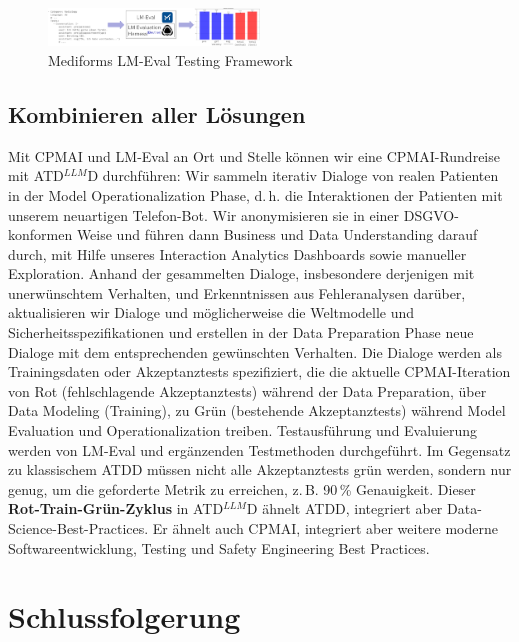 \documentclass[twocolumn]{article}
\newcommand{\ATDLLMD}{ATD$^{LLM}$D}%
\begin{document}
\begin{figure}[hbt!]
  \begin{center}
\includegraphics[width=0.5\textwidth]{figures/LMEval2}
  \vspace{-8mm}
\caption{Mediforms LM-Eval Testing Framework}
\label{fig:lmeval}
\end{center}
\end{figure}

\subsection{Kombinieren aller Lösungen}

Mit CPMAI und LM-Eval an Ort und Stelle können wir eine CPMAI-Rundreise mit \ATDLLMD{} durchführen: Wir sammeln iterativ Dialoge von realen Patienten in der Model Operationalization Phase, d.\,h. die Interaktionen der Patienten mit unserem neuartigen Telefon-Bot. Wir anonymisieren sie in einer DSGVO-konformen Weise und führen dann Business und Data Understanding darauf durch, mit Hilfe unseres Interaction Analytics Dashboards sowie manueller Exploration. Anhand der gesammelten Dialoge, insbesondere derjenigen mit unerwünschtem Verhalten, und Erkenntnissen aus Fehleranalysen darüber, aktualisieren wir Dialoge und möglicherweise die Weltmodelle und Sicherheitsspezifikationen und erstellen in der Data Preparation Phase neue Dialoge mit dem entsprechenden gewünschten Verhalten. Die Dialoge werden als Trainingsdaten oder Akzeptanztests spezifiziert, die die aktuelle CPMAI-Iteration von Rot (fehlschlagende Akzeptanztests) während der Data Preparation, über Data Modeling (Training), zu Grün (bestehende Akzeptanztests) während Model Evaluation und Operationalization treiben. Testausführung und Evaluierung werden von LM-Eval und ergänzenden Testmethoden durchgeführt. Im Gegensatz zu klassischem ATDD müssen nicht alle Akzeptanztests grün werden, sondern nur genug, um die geforderte Metrik zu erreichen, z.\,B. 90\,\% Genauigkeit. Dieser \textbf{Rot-Train-Grün-Zyklus} in \ATDLLMD{} ähnelt ATDD, integriert aber Data-Science-Best-Practices. Er ähnelt auch CPMAI, integriert aber weitere moderne Softwareentwicklung, Testing und Safety Engineering Best Practices.

\section{Schlussfolgerung}
\end{document}
